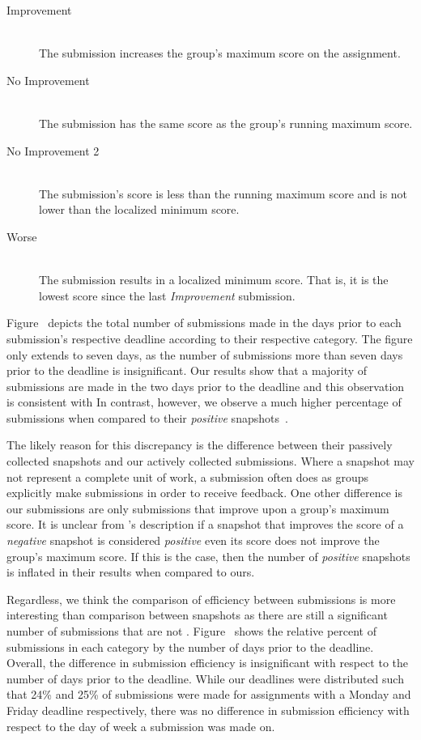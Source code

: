 \begin{description}
  \item[Improvement] \hfill \\ The submission increases the group's maximum
    score on the assignment.
  \item[No Improvement] \hfill \\ The submission has the same score as the
    group's running maximum score.
  \item[No Improvement 2] \hfill \\ The submission's score is less than the
    running maximum score and is not lower than the localized minimum score.
  \item[Worse] \hfill \\ The submission results in a localized minimum
    score. That is, it is the lowest score since the last \emph{Improvement}
    submission.
\end{description}

Figure~ depicts the total number of submissions
made in the days prior to each submission's respective deadline according to
their respective category. The figure only extends to seven days, as the number
of submissions more than seven days prior to the deadline is insignificant. Our
results show that a majority of submissions are made in the two days prior to
the deadline and this observation is consistent with \spacco[.]{} In contrast,
however, we observe a much higher percentage of \imp{} submissions when
compared to their \emph{positive}
snapshots~\cite{Spacco:2013:TIP:2462476.2465594}.

The likely reason for this discrepancy is the difference between their
passively collected snapshots and our actively collected submissions. Where a
snapshot may not represent a complete unit of work, a submission often does as
groups explicitly make submissions in order to receive feedback. One other
difference is our \imp{} submissions are only submissions that improve upon a
group's maximum score. It is unclear from \spacco{}'s description if a snapshot
that improves the score of a \emph{negative} snapshot is considered
\emph{positive} even its score does not improve the group's maximum score. If
this is the case, then the number of \emph{positive} snapshots is inflated in
their results when compared to ours.

Regardless, we think the comparison of efficiency between submissions is more
interesting than comparison between snapshots as there are still a significant
number of submissions that are not
\imp{}. Figure~ shows the relative percent of
submissions in each category by the number of days prior to the
deadline. Overall, the difference in submission efficiency is insignificant
with respect to the number of days prior to the deadline. While our deadlines
were distributed such that 24\% and 25\% of submissions were made for
assignments with a Monday and Friday deadline respectively, there was no
difference in submission efficiency with respect to the day of week a
submission was made on.

